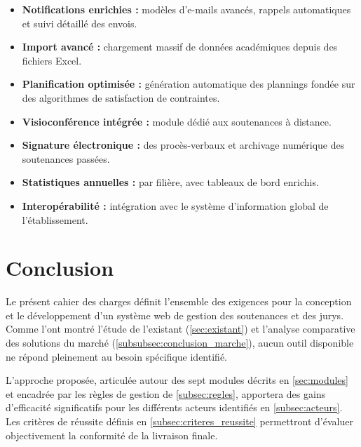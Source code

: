 \documentclass[12pt,a4paper]{article}
\begin{document}
\begin{itemize}[label=\textcolor{primary}{\textbullet}]
    \item \textbf{Notifications enrichies :} modèles d'e-mails avancés, rappels
          automatiques et suivi détaillé des envois.
    \item \textbf{Import avancé :} chargement massif de données académiques
          depuis des fichiers Excel.
    \item \textbf{Planification optimisée :} génération automatique des plannings
          fondée sur des algorithmes de satisfaction de contraintes.
    \item \textbf{Visioconférence intégrée :} module dédié aux soutenances à
          distance.
    \item \textbf{Signature électronique :} des procès-verbaux et archivage
          numérique des soutenances passées.
    \item \textbf{Statistiques annuelles :} par filière, avec tableaux de bord
          enrichis.
    \item \textbf{Interopérabilité :} intégration avec le système d'information
          global de l'établissement.
\end{itemize}

\section{Conclusion}
\label{sec:conclusion}

Le présent cahier des charges définit l'ensemble des exigences pour la
conception et le développement d'un système web de gestion des soutenances et
des jurys. Comme l'ont montré l'étude de l'existant (\ref{sec:existant}) et
l'analyse comparative des solutions du marché
(\ref{subsubsec:conclusion_marche}), aucun outil disponible ne répond
pleinement au besoin spécifique identifié.

L'approche proposée, articulée autour des sept modules décrits en
\ref{sec:modules} et encadrée par les règles de gestion de
\ref{subsec:regles}, apportera des gains d'efficacité significatifs pour les
différents acteurs identifiés en \ref{subsec:acteurs}. Les critères de réussite
définis en \ref{subsec:criteres_reussite} permettront d'évaluer objectivement
la conformité de la livraison finale.
\end{document}
